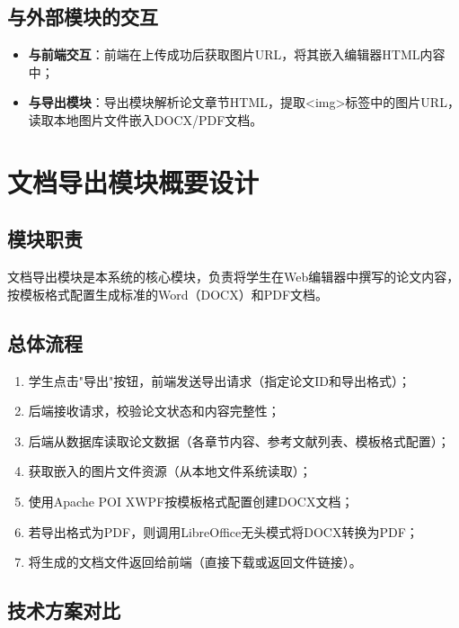 \documentclass{../softeng}
\begin{document}
\subsection{与外部模块的交互}

\begin{itemize}
    \item \textbf{与前端交互}：前端在上传成功后获取图片URL，将其嵌入编辑器HTML内容中；
    \item \textbf{与导出模块}：导出模块解析论文章节HTML，提取<img>标签中的图片URL，读取本地图片文件嵌入DOCX/PDF文档。
\end{itemize}

\section{文档导出模块概要设计}

\subsection{模块职责}

文档导出模块是本系统的核心模块，负责将学生在Web编辑器中撰写的论文内容，按模板格式配置生成标准的Word（DOCX）和PDF文档。

\subsection{总体流程}

\begin{enumerate}
    \item 学生点击"导出"按钮，前端发送导出请求（指定论文ID和导出格式）；
    \item 后端接收请求，校验论文状态和内容完整性；
    \item 后端从数据库读取论文数据（各章节内容、参考文献列表、模板格式配置）；
    \item 获取嵌入的图片文件资源（从本地文件系统读取）；
    \item 使用Apache POI XWPF按模板格式配置创建DOCX文档；
    \item 若导出格式为PDF，则调用LibreOffice无头模式将DOCX转换为PDF；
    \item 将生成的文档文件返回给前端（直接下载或返回文件链接）。
\end{enumerate}

\subsection{技术方案对比}
\end{document}
